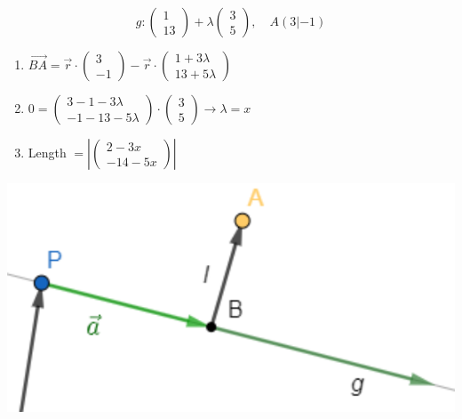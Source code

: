 \begin{example}
    $$g: \begin{pmatrix} 1 \\ 13 \end{pmatrix} + \lambda \begin{pmatrix} 3 \\ 5 \end{pmatrix}, \quad A(3|-1)$$
    \begin{minipage}{0.65\linewidth}
    \begin{enumerate}
        \item $\overrightarrow{BA} = \vec{r} \cdot \begin{pmatrix} 3 \\ -1 \end{pmatrix} - \vec{r} \cdot \begin{pmatrix} 1 + 3 \lambda \\ 13 + 5 \lambda \end{pmatrix}$
        \item $0 = \begin{pmatrix} 3 - 1 - 3 \lambda \\ -1 - 13 - 5 \lambda \end{pmatrix} \cdot \begin{pmatrix} 3 \\ 5 \end{pmatrix} \rightarrow \lambda = x$
        \item Length $ = \left| \begin{pmatrix} 2 - 3x \\ -14 - 5x \end{pmatrix} \right|$ 
    \end{enumerate}
    \end{minipage}
    \begin{minipage}{0.3\linewidth}
    \includegraphics[width=1\linewidth]{abstand.png}
    \end{minipage}
\end{example}

